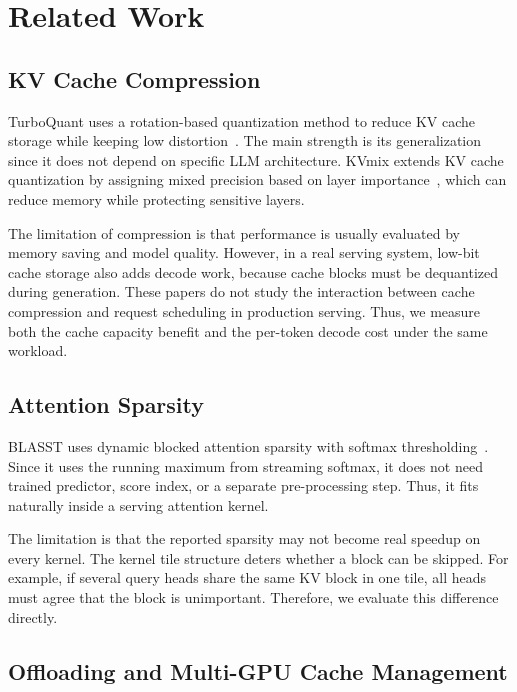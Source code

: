 \documentclass[conference]{IEEEtran}
\begin{document}
\clearpage
\section{Related Work}

\subsection{KV Cache Compression}

TurboQuant uses a rotation-based quantization method to reduce KV cache storage while keeping low distortion~\cite{turboquant2025}. The main strength is its generalization since it does not depend on specific LLM architecture. KVmix extends KV cache quantization by assigning mixed precision based on layer importance~\cite{kvmix2026}, which can reduce memory while protecting sensitive layers.

The limitation of compression is that performance is usually evaluated by memory saving and model quality. However, in a real serving system, low-bit cache storage also adds decode work, because cache blocks must be dequantized during generation. These papers do not study the interaction between cache compression and request scheduling in production serving. Thus, we measure both the cache capacity benefit and the per-token decode cost under the same workload.

\subsection{Attention Sparsity}

BLASST uses dynamic blocked attention sparsity with softmax thresholding~\cite{blasst2025}. Since it uses the running maximum from streaming softmax, it does not need trained predictor, score index, or a separate pre-processing step. Thus, it fits naturally inside a serving attention kernel.

The limitation is that the reported sparsity may not become real speedup on every kernel. The kernel tile structure deters whether a block can be skipped. For example, if several query heads share the same KV block in one tile, all heads must agree that the block is unimportant. Therefore, we evaluate this difference directly.

\subsection{Offloading and Multi-GPU Cache Management}
\end{document}
